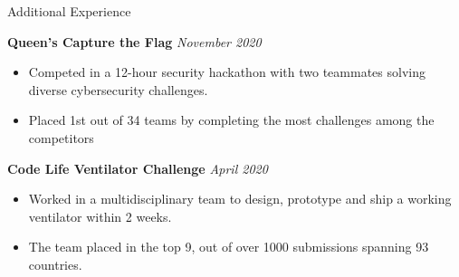 \documentclass{resume}
\begin{document}
	\begin{rSection}{Additional Experience}

		{\bf Queen's Capture the Flag} \hfill {\em November 2020}
		\vspace{-2mm}
		\begin{itemize}
			\setlength{\itemsep}{-8pt}
			\item Competed in a 12-hour security hackathon with two teammates solving diverse cybersecurity challenges.
			\item Placed 1st out of 34 teams by completing the most challenges among the competitors
		\end{itemize}

		{\bf Code Life Ventilator Challenge} \hfill {\em April 2020}
		\vspace{-2mm}
		\begin{itemize}
			\setlength{\itemsep}{-8pt}
			\item Worked in a multidisciplinary team to design, prototype and ship a working ventilator within 2 weeks.
			\item The team placed in the top 9, out of over 1000 submissions spanning 93 countries.
		\end{itemize}

	\end{rSection}
\end{document}
